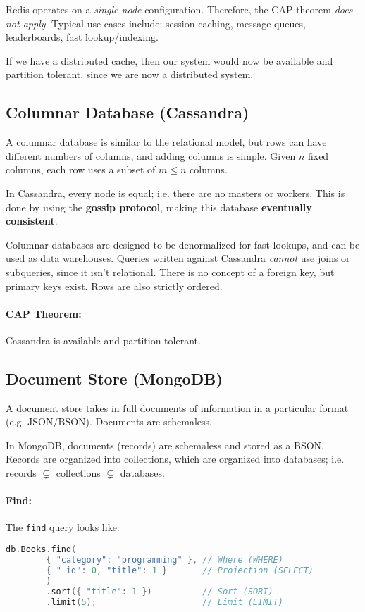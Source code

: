 \documentclass{report}
\newenvironment{example}{\begin{tcolorbox}[title={Example},colback=green!5!white,colframe=black!75!green]}{\end{tcolorbox}}
\renewcommand{\bf}[1]{\textbf{{#1}}}
\renewcommand{\tt}[1]{\texttt{{#1}}}
\renewcommand{\it}[1]{\textit{{#1}}}
\begin{document}
Redis operates on a \it{single node} configuration. Therefore, the CAP theorem
\it{does not apply}. Typical use cases include: session caching, message queues,
leaderboards, fast lookup/indexing.
\begin{example}
    If we have a distributed cache, then our system would now be available and
    partition tolerant, since we are now a distributed system.
\end{example}

\subsection{Columnar Database (Cassandra)}
A columnar database is similar to the relational  model, but rows can have
different numbers of columns, and adding columns is simple. Given $n$ fixed
columns, each row uses a subset of $m \leq n$ columns.

In Cassandra, every node is equal; i.e. there are no masters or workers. This is
done by using the \bf{gossip protocol}, making this database
\bf{eventually consistent}.

Columnar databases are designed to be denormalized for fast lookups, and can be
used as data warehouses. Queries written against Cassandra \it{cannot} use joins
or subqueries, since it isn't relational. There is no concept of a foreign key,
but primary keys exist. Rows are also strictly ordered.

\paragraph{CAP Theorem:} Cassandra is available and partition tolerant.

\subsection{Document Store (MongoDB)}
A document store takes in full documents of information in a particular format
(e.g. JSON/BSON). Documents are schemaless.

In MongoDB, documents (records) are schemaless and stored as a BSON.
Records are organized into collections, which are organized into databases; i.e.
records $\subsetneq$ collections $\subsetneq$ databases.

\paragraph{Find:} The \tt{find} query looks like:
\begin{lstlisting}[language=C++, style=colorEX]
    db.Books.find(
        { "category": "programming" }, // Where (WHERE)
        { "_id": 0, "title": 1 }       // Projection (SELECT)
        )
        .sort({ "title": 1 })          // Sort (SORT)
        .limit(5);                     // Limit (LIMIT)
\end{lstlisting}
\end{document}
